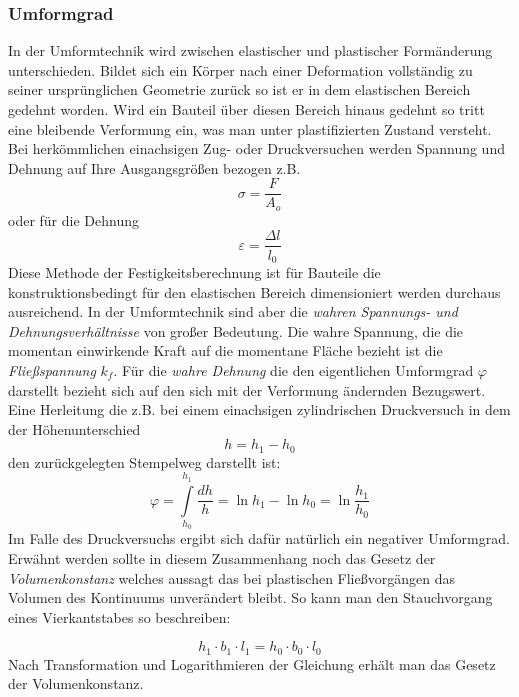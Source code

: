 \documentclass[12pt,a4paper,parskip,twoside,BCOR5mm,headsepline]{scrartcl}
\begin{document}
\begin{description*}
\subsubsection{Umformgrad}
In der Umformtechnik wird zwischen elastischer und plastischer Formänderung unterschieden. Bildet sich ein Körper nach einer Deformation vollständig zu seiner ursprünglichen Geometrie zurück so ist er in dem elastischen Bereich gedehnt worden. Wird ein Bauteil über diesen Bereich hinaus gedehnt so tritt eine bleibende Verformung ein, was man unter plastifizierten Zustand versteht.  Bei herkömmlichen einachsigen Zug- oder Druckversuchen werden Spannung und Dehnung auf Ihre Ausgangsgrößen bezogen z.B. \begin{equation}\sigma=\frac{F}{A_o}\end{equation} oder für die Dehnung \begin{equation}\varepsilon = \frac{\Delta l}{l_0}\end{equation} Diese Methode der Festigkeitsberechnung ist für Bauteile die konstruktionsbedingt für den elastischen Bereich dimensioniert werden   durchaus ausreichend. In der Umformtechnik sind aber die \emph{wahren Spannungs- und Dehnungsverhältnisse} von großer Bedeutung. Die wahre Spannung, die die momentan einwirkende Kraft auf die momentane Fläche bezieht ist die \emph{Fließspannung} $ k_f $. Für die \emph{wahre Dehnung} die den eigentlichen Umformgrad $ \varphi $ darstellt bezieht sich auf den sich mit der Verformung ändernden Bezugswert. Eine Herleitung die z.B. bei einem einachsigen zylindrischen Druckversuch in dem der Höhenunterschied \begin{equation}
h=h_1-h_0 \end{equation}  den zurückgelegten Stempelweg darstellt ist:\begin{equation}
\varphi=\int\limits_{h_0}^{h_1}\frac{dh}{h}=\ln h_1 - \ln h_0 = \ln\frac{h_1}{h_0}\end{equation} Im Falle des Druckversuchs ergibt sich dafür natürlich ein negativer Umformgrad. Erwähnt werden sollte in diesem Zusammenhang noch das Gesetz der \emph{Volumenkonstanz} welches aussagt das  bei plastischen Fließvorgängen das Volumen des Kontinuums unverändert bleibt. So kann man den Stauchvorgang eines Vierkantstabes so beschreiben: 






 \begin{equation}h_1 \cdot  b_1 \cdot l_1 = h_0 \cdot b_0 \cdot l_0\end{equation} 
Nach Transformation und Logarithmieren der Gleichung erhält man
das Gesetz der Volumenkonstanz. 
 

\end{description*}
\end{document}

